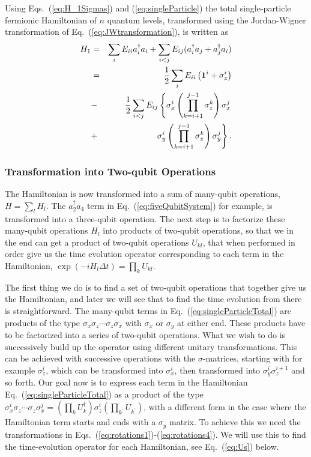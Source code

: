Using Eqs.~(\ref{eq:H_1Sigmas}) and (\ref{eq:singleParticle})
the total single-particle fermionic Hamiltonian of $n$ quantum levels,
transformed using the Jordan-Wigner transformation of
Eq.~(\ref{eq:JWtransformation}), is written as
\begin{eqnarray}
\label{eq:singleParticleTotal}
H_1 &=& \sum_{i} E_{ii} a^\dag_i a_i +
\sum_{i<j} E_{ij} (a^\dag_i a_j + a^\dag_j a_i) \notag\\
&=&
 \frac{1}{2}\sum_{i} E_{ii}\left({\bf 1}^i + \sigma_z^i\right)
\notag\\
&-& \frac{1}{2}\sum_{i<j} E_{ij} 
  \left\{ 
\sigma_x^i \left(\prod_{k=i+1}^{j-1}\sigma_z^k \right)\sigma_x^j \right.\notag\\
&+& \left.\sigma_y^i \left(\prod_{k=i+1}^{j-1}\sigma_z^k \right)\sigma_y^j
\right\}.
\end{eqnarray}


\subsubsection{Transformation into Two-qubit Operations}
The Hamiltonian is now transformed into a sum of many-qubit
operations, $H=\sum_l H_l$. The $a_2^\dag a_4$ term in Eq.~(\ref{eq:fiveQubitSystem})
for example, is transformed into a three-qubit operation. The next
step is to factorize these many-qubit operations $H_l$ into products of
two-qubit operations, so that we in the end can get a product of
two-qubit operations $U_{kl}$, that when performed in order give us the time
evolution operator corresponding to each term in the Hamiltonian, 
$\exp(-iH_l\Delta t) = \prod_k U_{kl}$.


The first thing we do is to find a set of two-qubit operations that
together give us the Hamiltonian, and later  we will see that to
find the time evolution from there is straightforward. 
The many-qubit terms in Eq.~(\ref{eq:singleParticleTotal}) are 
products of the type $\sigma_x \sigma_z \cdots \sigma_z \sigma_x$
with $\sigma_x$ or $\sigma_y$ at either end. These products have to be
factorized into a series of two-qubit operations.
What we wish to do is successively build up the operator using
different unitary transformations. 
This can be achieved with successive operations with the $\sigma$-matrices, starting with for example
$\sigma_z^i$, which can be transformed 
into $\sigma_x^i$, then transformed into $\sigma_y^i\sigma_z^{i+1}$
and so forth.
Our goal now is to express each term in the Hamiltonian
Eq.~(\ref{eq:singleParticleTotal}) as a product of the type
$\sigma_x^i \sigma_z \cdots \sigma_z 
\sigma_x^j=
(\prod_k U_k^\dag ) \sigma_z^i 
(\prod_{k^\prime} U_{k^\prime})$, with a different form in the case
where the Hamiltonian term starts and ends with a $\sigma_y$ matrix.
To achieve this we need the transformations in
Eqs.~(\ref{eq:rotations1})-(\ref{eq:rotations4}). 
We will use this to find the time-evolution operator for each Hamiltonian, see
Eq.~(\ref{eq:Us}) below. 

